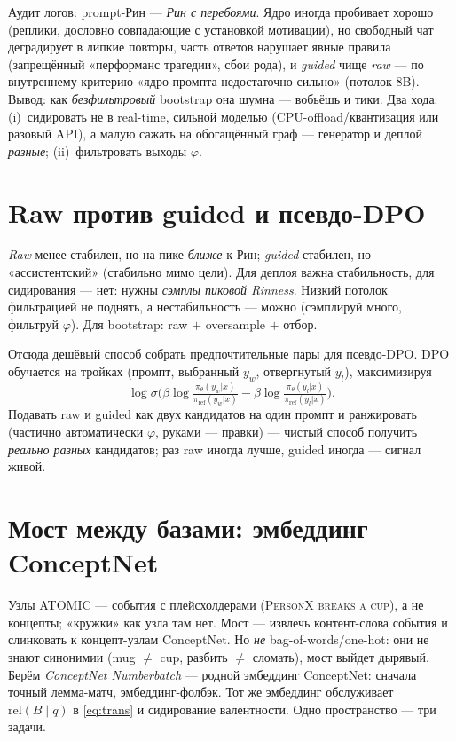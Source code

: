 \begin{pitfall}
Аудит логов: prompt-Рин — \emph{Рин с перебоями}. Ядро иногда пробивает хорошо
(реплики, дословно совпадающие с установкой мотивации), но свободный чат деградирует
в липкие повторы, часть ответов нарушает явные правила (запрещённый «перформанс
трагедии», сбои рода), и \emph{guided} чище \emph{raw} — по внутреннему критерию
«ядро промпта недостаточно сильно» (потолок $8$B). Вывод: как \emph{безфильтровый}
bootstrap она шумна — вобьёшь и тики. Два хода: (i)~сидировать не в real-time,
сильной моделью (CPU-offload/квантизация или разовый API), а малую сажать на
обогащённый граф — генератор и деплой \emph{разные}; (ii)~фильтровать выходы $\varphi$.
\end{pitfall}

\section{Raw против guided и псевдо-DPO}

\emph{Raw} менее стабилен, но на пике \emph{ближе} к Рин; \emph{guided} стабилен, но
«ассистентский» (стабильно мимо цели). Для деплоя важна стабильность, для сидирования
— нет: нужны \emph{сэмплы пиковой Rinness}. Низкий потолок фильтрацией не поднять, а
нестабильность — можно (сэмплируй много, фильтруй $\varphi$). Для bootstrap: raw $+$
oversample $+$ отбор.

Отсюда дешёвый способ собрать предпочтительные пары для псевдо-DPO. DPO обучается на
тройках (промпт, выбранный $y_w$, отвергнутый $y_l$), максимизируя
\[
\log\sigma\!\Big(\beta\log\tfrac{\pi_\theta(y_w|x)}{\pi_{\text{ref}}(y_w|x)}
-\beta\log\tfrac{\pi_\theta(y_l|x)}{\pi_{\text{ref}}(y_l|x)}\Big).
\]
Подавать raw и guided как двух кандидатов на один промпт и ранжировать (частично
автоматически $\varphi$, руками — правки) — чистый способ получить \emph{реально
разных} кандидатов; раз raw иногда лучше, guided иногда — сигнал живой.

\section{Мост между базами: эмбеддинг ConceptNet}

Узлы ATOMIC — события с плейсхолдерами (\textsc{PersonX breaks a cup}), а не
концепты; «кружки» как узла там нет. Мост — извлечь контент-слова события и слинковать
к концепт-узлам ConceptNet. Но \emph{не} bag-of-words/one-hot: они не знают синонимии
(mug $\ne$ cup, разбить $\ne$ сломать), мост выйдет дырявый. Берём \emph{ConceptNet
Numberbatch} — родной эмбеддинг ConceptNet: сначала точный лемма-матч, эмбеддинг-фолбэк.
Тот же эмбеддинг обслуживает $\text{rel}(B\mid q)$ в \eqref{eq:trans} и сидирование
валентности. Одно пространство — три задачи.
